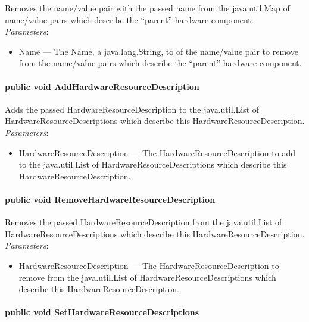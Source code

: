\documentclass[$Date: 2003/06/26 19:29:31 $]{glabarticle}
\begin{document}
Removes the name/value pair with the passed name from the java.util.Map of
name/value pairs which describe the ``parent'' hardware component. \\

\textit{Parameters}:
\begin{itemize}
\item[] Name --- The Name, a java.lang.String, to of the name/value pair to remove from the  name/value pairs 
which describe the ``parent'' hardware component.
\end{itemize}

\paragraph{public void AddHardwareResourceDescription}

Adds the passed HardwareResourceDescription to the java.util.List of
HardwareResourceDescriptions which describe this
HardwareResourceDescription. \\

\textit{Parameters}:
\begin{itemize}
\item[] HardwareResourceDescription --- The HardwareResourceDescription to add to the java.util.List of 
HardwareResourceDescriptions which describe this HardwareResourceDescription.
\end{itemize}
 
\paragraph{public void RemoveHardwareResourceDescription}

Removes the passed HardwareResourceDescription from the java.util.List of
HardwareResourceDescriptions which describe this
HardwareResourceDescription. \\

\textit{Parameters}:
\begin{itemize}
\item[] HardwareResourceDescription --- The HardwareResourceDescription
to remove from the java.util.List of HardwareResourceDescriptions which describe
this HardwareResourceDescription.
\end{itemize}

\paragraph{public void SetHardwareResourceDescriptions}
\end{document}
